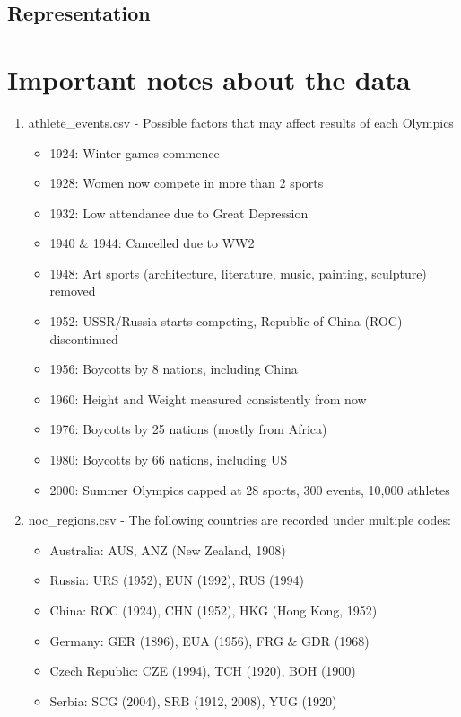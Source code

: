 \documentclass[a4 paper, 12pt]{article}
\begin{document}
    \pagebreak
    \subsection{Representation}
    

    \pagebreak
    \section{Important notes about the data}
    \begin{enumerate}
        \item athlete\_events.csv - Possible factors that may affect results of each Olympics
            \begin{itemize}
                \item 1924: Winter games commence
                \item 1928: Women now compete in more than 2 sports
                \item 1932: Low attendance due to Great Depression
                \item 1940 \& 1944: Cancelled due to WW2
                \item 1948: Art sports (architecture, literature, music, painting, sculpture) removed
                \item 1952: USSR/Russia starts competing, Republic of China (ROC) discontinued
                \item 1956: Boycotts by 8 nations, including China
                \item 1960: Height and Weight measured consistently from now
                \item 1976: Boycotts by 25 nations (mostly from Africa)
                \item 1980: Boycotts by 66 nations, including US
                \item 2000: Summer Olympics capped at 28 sports, 300 events, 10,000 athletes                
            \end{itemize}

        \item noc\_regions.csv - The following countries are recorded under multiple codes:
            
        \begin{itemize}
                \item Australia: AUS, ANZ (New Zealand, 1908)
                \item Russia: URS (1952), EUN (1992), RUS (1994)
                \item China: ROC (1924), CHN (1952), HKG (Hong Kong, 1952)
                \item Germany: GER (1896), EUA (1956), FRG \& GDR (1968)
                \item Czech Republic: CZE (1994), TCH (1920), BOH (1900)
                \item Serbia: SCG (2004), SRB (1912, 2008), YUG (1920)                    
            \end{itemize}  

    \end{enumerate}
\end{document}
